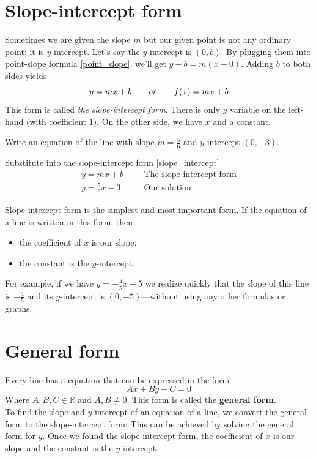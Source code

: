 \section{Slope-intercept form}
Sometimes we are given the slope $m$ but our given point is not any
ordinary point; it is $y$-intercept. Let's say the $y$-intercept
is $(0,b)$. By plugging them into point-slope formula \eqref{point_slope},
we'll get $y- b = m(x-0) $. Adding $b$ to both sides yields
\begin{equation}
			y = mx+ b\qquad or\qquad f(x)=mx+b \label{slope_intercept}\\
\end{equation}
This form is called \textit{the slope-intercept form}. There is only $y$ variable  on the left-hand (with coefficient 1). On the other side, we have $x$ and a constant.
\begin{exa}
	Write an equation of the line with slope $m=\frac{5}{6}$ and $y$-intercept $(0,-3)$.
\end{exa}
\vspace{0.2 cm}
Substitute into the slope-intercept form \eqref{slope_intercept}
\begin{align*}
            y = mx+ b&      &   &\text{The slope-intercept form}\\
			y = \frac{5}{6}x -3&    &   &\text{Our solution}
\end{align*}
\vspace{0.2cm}
\begin{nt}
Slope-intercept form is the simplest and most important form. If the equation of a line is written in this form, then 
\begin{itemize}
	\item the coefficient of $x$ is our slope;
	\item the constant is the $y$-intercept.
\end{itemize}
For example, if we have $y=-\frac{4}{5}x-5$ we realize quickly that the slope of this line is $-\frac{4}{5}$ and its $y$-intercept is $(0,-5)$---without using any other formulas or graphs.
\end{nt}
\section{General form}
Every line has a equation that can be expressed in the form
\begin{equation}
    			Ax+By+C=0 \label{general_form}
\end{equation}
Where $A, B, C \in \mathbb{R}$ and $A,B \neq 0$. This form is called the \textbf{general form}.\\
To find the slope and $y$-intercept of an equation of a line, we convert the general form to the slope-intercept form; This can be achieved by solving the general form for $y$. Once we found the slope-intercept form, the coefficient of $x$ is our slope and the constant is the $y$-intercept.

